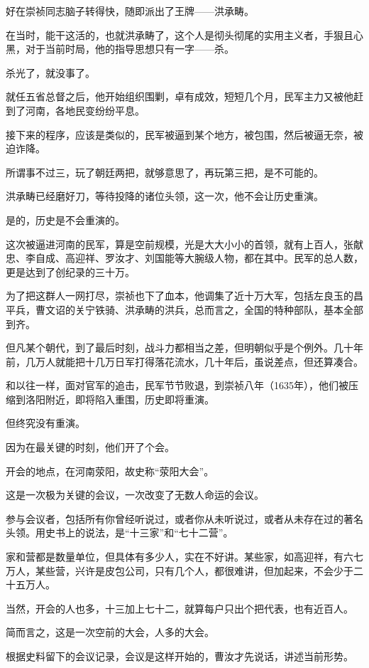 \begin{multicols}{\theparacolNo}
		好在崇祯同志脑子转得快，随即派出了王牌——洪承畴。

		在当时，能干这活的，也就洪承畴了，这个人是彻头彻尾的实用主义者，手狠且心黑，对于当前时局，他的指导思想只有一字——杀。

		杀光了，就没事了。

		就任五省总督之后，他开始组织围剿，卓有成效，短短几个月，民军主力又被他赶到了河南，各地民变纷纷平息。

		接下来的程序，应该是类似的，民军被逼到某个地方，被包围，然后被逼无奈，被迫诈降。

		所谓事不过三，玩了朝廷两把，就够意思了，再玩第三把，是不可能的。

		洪承畴已经磨好刀，等待投降的诸位头领，这一次，他不会让历史重演。

		是的，历史是不会重演的。

		这次被逼进河南的民军，算是空前规模，光是大大小小的首领，就有上百人，张献忠、李自成、高迎祥、罗汝才、刘国能等大腕级人物，都在其中。民军的总人数，更是达到了创纪录的三十万。

		为了把这群人一网打尽，崇祯也下了血本，他调集了近十万大军，包括左良玉的昌平兵，曹文诏的关宁铁骑、洪承畴的洪兵，总而言之，全国的特种部队，基本全部到齐。

		但凡某个朝代，到了最后时刻，战斗力都相当之差，但明朝似乎是个例外。几十年前，几万人就能把十几万日军打得落花流水，几十年后，虽说差点，但还算凑合。

		和以往一样，面对官军的追击，民军节节败退，到崇祯八年（1635年），他们被压缩到洛阳附近，即将陷入重围，历史即将重演。

		但终究没有重演。

		因为在最关键的时刻，他们开了个会。

		开会的地点，在河南荥阳，故史称“荥阳大会”。

		这是一次极为关键的会议，一次改变了无数人命运的会议。

		参与会议者，包括所有你曾经听说过，或者你从未听说过，或者从未存在过的著名头领。用史书上的说法，是“十三家”和“七十二营”。

		家和营都是数量单位，但具体有多少人，实在不好讲。某些家，如高迎祥，有六七万人，某些营，兴许是皮包公司，只有几个人，都很难讲，但加起来，不会少于二十五万人。

		当然，开会的人也多，十三加上七十二，就算每户只出个把代表，也有近百人。

		简而言之，这是一次空前的大会，人多的大会。

		根据史料留下的会议记录，会议是这样开始的，曹汝才先说话，讲述当前形势。


\end{multicols}
